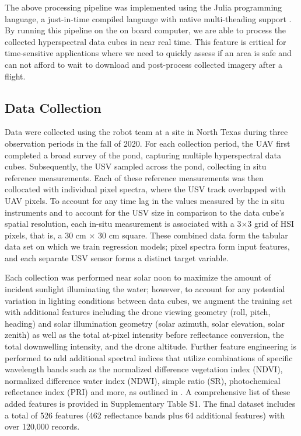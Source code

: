 \documentclass[remotesensing,article,submit,pdftex,moreauthors]{Definitions/mdpi}
\begin{document}
The above processing pipeline was implemented using the Julia programming language, a just-in-time compiled language with native multi-theading support \cite{julia-1}. By running this pipeline on the on board computer, we are able to process the collected hyperspectral data cubes in near real time. This feature is critical for time-sensitive applications where we need to quickly assess if an area is safe and can not afford to wait to download and post-process collected imagery after a flight.

\subsection{Data Collection}

Data were collected using the robot team at a site in North Texas during three observation periods in the fall of 2020. For each collection period, the UAV first completed a broad survey of the pond, capturing multiple hyperspectral data cubes. Subsequently, the USV sampled across the pond, collecting in situ reference measurements. Each of these reference measurements was then collocated with individual pixel spectra, where the USV track overlapped with UAV pixels. To account for any time lag in the values measured by the in situ instruments and to account for the USV size in comparison to the data cube's spatial resolution, each in-situ measurement is associated with a 3$\times$3 grid of HSI pixels, that is, a 30 cm $\times$ 30 cm square. These combined data form the tabular data set on which we train regression models; pixel spectra form input features, and each separate USV sensor forms a distinct target variable. 

Each collection was performed near solar noon to maximize the amount of incident sunlight illuminating the water; however, to account for any potential variation in lighting conditions between data cubes, we augment the training set with additional features including the drone viewing geometry (roll, pitch, heading) and solar illumination geometry (solar azimuth, solar elevation, solar zenith) as well as the total at-pixel intensity before reflectance conversion, the total downwelling intensity, and the drone altitude. Further feature engineering is performed to add additional spectral indices that utilize combinations of specific wavelength bands such as the normalized difference vegetation index (NDVI), normalized difference water index (NDWI), simple ratio (SR), photochemical reflectance index (PRI) and more, as outlined in \cite{envi_vegetation_indices, thenkabail2018hyperspectral,kaufman1992atmospherically, SpectralIndexWheat}. A comprehensive list of these added features is provided in Supplementary Table S1. The final dataset includes a total of 526 features (462 reflectance bands plus 64 additional features) with over 120,000 records. 
\end{document}
